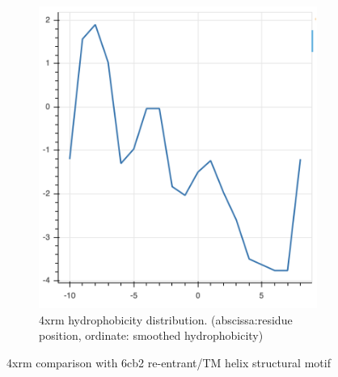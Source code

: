 \begin{figure}[htb]
\begin{subfigure}{0.3\textwidth}
  \includegraphics[width=\linewidth]{Results/4x_hydro.png}
  \caption{4xrm hydrophobicity distribution. (abscissa:residue position, ordinate: smoothed hydrophobicity)}
  \label{fig:4xb}
\end{subfigure}
\caption{4xrm comparison with 6cb2 re-entrant/TM helix structural motif }
\small
\label{fig:4x}
\end{figure}


